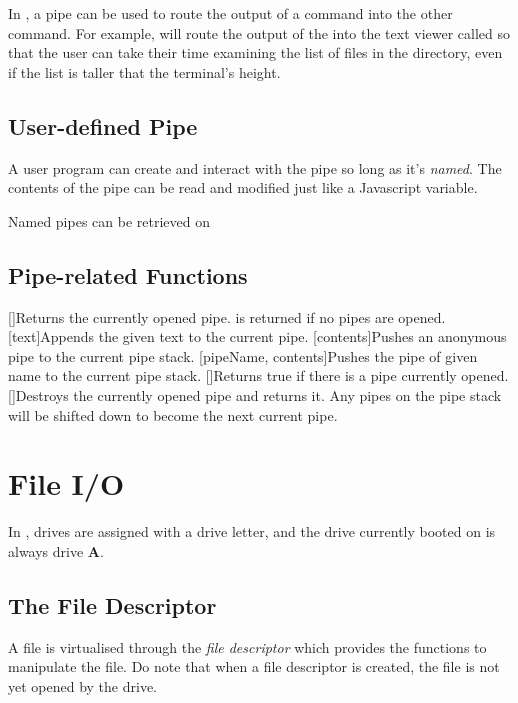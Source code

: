 In \thedos, a pipe can be used to route the output of a command into the other command. For example,  will route the output of the  into the text viewer called  so that the user can take their time examining the list of files in the directory, even if the list is taller that the terminal's height.

\section{User-defined Pipe}

A user program can create and interact with the pipe so long as it's \emph{named}. The contents of the pipe can be read and modified just like a Javascript variable.

Named pipes can be retrieved on 

\section{Pipe-related Functions}

\begin{outline}
\1[]{Returns the currently opened pipe.  is returned if no pipes are opened.}
\1[text]{Appends the given text to the current pipe.}
\1[contents]{Pushes an anonymous pipe to the current pipe stack.}
\1[pipeName, contents]{Pushes the pipe of given name to the current pipe stack.}
\1[]{Returns true if there is a pipe currently opened.}
\1[]{Destroys the currently opened pipe and returns it. Any pipes on the pipe stack will be shifted down to become the next current pipe.}
\end{outline}


\chapter{File I/O}
In \thedos, drives are assigned with a drive letter, and the drive currently booted on is always drive \textbf{A}.


\section{The File Descriptor}
A file is virtualised through the \emph{file descriptor} which provides the functions to manipulate the file. Do note that when a file descriptor is created, the file is not yet opened by the drive.

